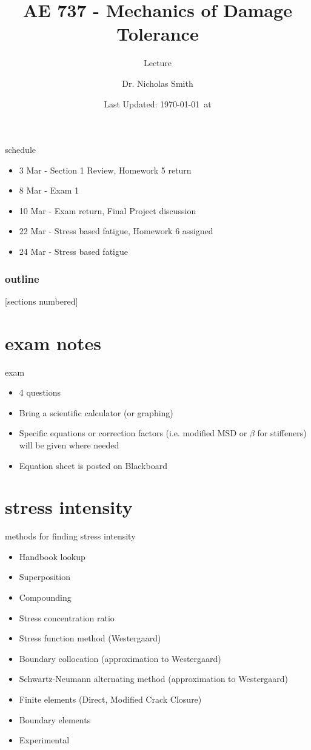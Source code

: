 \documentclass[10pt]{beamer}
\title{AE 737 - Mechanics of Damage Tolerance}
\subtitle{Lecture \arabic{lecture}}
\date{Last Updated: \today\ at \DTMcurrenttime}
\author{Dr. Nicholas Smith}
\institute{Wichita State University, Department of Aerospace Engineering}
\begin{document}
\maketitle
\begin{frame}{schedule}
	\begin{itemize}
		\item 3 Mar - Section 1 Review, Homework 5 return
		\item 8 Mar - Exam 1
		\item 10 Mar - Exam return, Final Project discussion
		\item 22 Mar - Stress based fatigue, Homework 6 assigned
		\item 24 Mar - Stress based fatigue
	\end{itemize}
\end{frame}

\begin{frame}
  \frametitle{outline}
  [sections numbered]
  \tableofcontents[hideallsubsections]
\end{frame}

\section{exam notes}

\begin{frame}{exam}
	\begin{itemize}[<+->]
		\item 4 questions
		\item Bring a scientific calculator (or graphing)
		\item Specific equations or correction factors (i.e. modified MSD or $\beta$ for stiffeners) will be given where needed
		\item Equation sheet is posted on Blackboard
	\end{itemize}
\end{frame}

\section{stress intensity}

\begin{frame}{methods for finding stress intensity}
	\begin{itemize}[<+->]
		\item Handbook lookup
		\item Superposition
		\item Compounding
		\item Stress concentration ratio
		\item Stress function method (Westergaard)
		\item Boundary collocation (approximation to Westergaard)
		\item Schwartz-Neumann alternating method (approximation to Westergaard)
		\item Finite elements (Direct, Modified Crack Closure)
		\item Boundary elements
		\item Experimental
	\end{itemize}
\end{frame}
\end{document}
